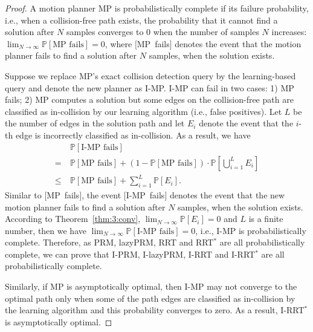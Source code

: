 \begin{proof}
  A motion planner MP is probabilistically complete if its failure probability, i.e., when a collision-free path exists, the probability that it cannot find a solution after $N$ samples converges to $0$ when the number of samples $N$ increases: $\lim_{N\rightarrow \infty}\mathbb P [\text{MP fails}] = 0$, where \mbox{$[$MP fails$]$} denotes the event that the motion planner fails to find a solution after $N$ samples, when the solution exists.

  Suppose we replace MP's exact collision detection query by the learning-based query and denote the new planner as I-MP. I-MP can fail in two cases: 1) MP fails; 2) MP computes a solution but some edges on the collision-free path are classified as in-collision by our learning algorithm (i.e., false positives). Let $L$ be the number of edges in the solution path and let $E_i$ denote the event that the $i$-th edge is incorrectly classified as in-collision. As a result, we have
  \begin{equation}
    \begin{aligned}
      & \ \mathbb P [\text{I-MP fails}] \\
      =& \ \mathbb P [\text{MP fails}] + (1 - \mathbb P [\text{MP fails}]) \cdot \mathbb P[\bigcup_{i=1}^L E_i] \\
      \leq& \ \mathbb P [\text{MP fails}] + \sum_{i=1}^L \mathbb P[E_i].
    \end{aligned}
  \end{equation}
  Similar to \mbox{$[$MP fails$]$}, the event \mbox{$[$I-MP fails$]$} denotes the event that the new motion planner fails to find a solution after $N$ samples, when the solution exists.
  According to Theorem~\ref{thm:3:conv}, $\lim_{N\rightarrow \infty}\mathbb P [E_i] = 0$ and $L$ is a finite number, then we have $\lim_{N\rightarrow \infty}\mathbb P [\text{I-MP fails}] = 0$, i.e., I-MP is probabilistically complete. Therefore, as PRM, lazyPRM, RRT and RRT${}^*$ are all probabilistically complete, we can prove that I-PRM, I-lazyPRM, I-RRT and  I-RRT${}^*$ are all probabilistically complete.

  Similarly, if MP is asymptotically optimal, then I-MP may not converge to the optimal path only when some of the path edges are classified as in-collision by the learning algorithm and this probability converges to zero. As a result, I-RRT${}^*$ is asymptotically optimal.
\end{proof}




